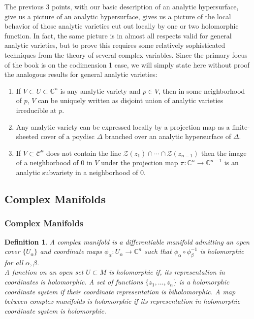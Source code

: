 \documentclass{article}
\newtheorem{defn}{Definition}
\begin{document}
The previous 3 points, with our basic description of an analytic hypersurface, give us a picture of an analytic hypersurface, gives us a picture of the local behavior of those analytic varieties cut out locally by one or two holomorphic function. In fact, the same picture is in almost all respects valid for general analytic varieties, but to prove this requires some relatively sophisticated techniques from the theory of several complex variables. Since the primary focus of the book is on the codimension 1 case, we will simply state here without proof the analogous results for general analytic varieties:

\begin{enumerate}
\item If $V \subset U \subset \mathbb{C}^n$ is any analytic variety and $p \in V$, then in some neighborhood of $p$, $V$ can be uniquely written as disjoint union of analytic varieties irreducible at $p$.
\item Any analytic variety can be expressed locally by a projection map as a finite-sheeted cover of a poydisc $\Delta$ branched over an analytic hypersurface of $\Delta$.
\item If $V \subset \mathcal{C}^n$ does not contain the line $ \mathcal{Z}(z_1) \cap \cdots \cap \mathcal{Z}(z_{n-1})$ then the image of a neighborhood of 0 in $V$ under the projection map $\pi: \mathbb{C}^n \to \mathbb{C}^{n-1}$ is an analytic subvariety in a neighborhood of 0.

\end{enumerate}

\subsection{Complex Manifolds}
\subsubsection{Complex Manifolds}


\begin{defn}

	A \textit{complex manifold} is a differentiable manifold admitting an open cover $ \{ U_{\alpha} \} $ and coordinate maps $ \phi_{\alpha}: U_{\alpha} \to \mathbb{C}^n$ such that $\phi_{\alpha} \circ \phi_{\beta}^{-1}$ is holomorphic for all $\alpha, \beta$.\\
\indent A function on an open set $U \subset M$ is \textit{holomorphic} if, its representation in coordinates is holomorphic. A set of functions $ \{ z_1, \ldots, z_n \} $ is a holomorphic coordinate system if their coordinate representation is biholomorphic. A map between complex manifolds is holomorphic if its representation in holomorphic coordinate system is holomorphic.

\end{defn}
\end{document}
